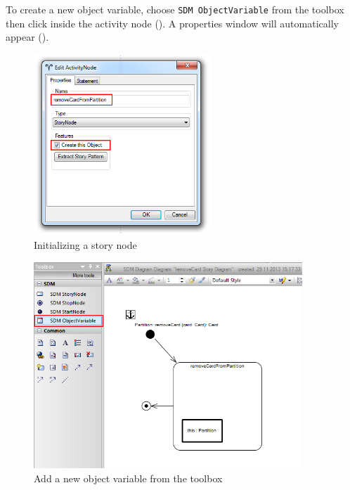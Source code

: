\begin{stepbystep}
\item To create a new object variable, choose \texttt{SDM ObjectVariable} from the toolbox then click inside the activity node
(). A properties window will automatically appear ().

\begin{figure}[htpb]
\begin{center} 
  \includegraphics[width=0.6\textwidth]{../../org.moflon.doc.handbook.03_storyDiagrams/03_removeCard/visRemImages/ea_sdmEditActivityNode}
  \caption{Initializing a story node}  
  \label{ea:story_pattern}
\end{center}
\end{figure}

\begin{figure}[htp]
\begin{center}
  \includegraphics[width=0.9\textwidth]{../../org.moflon.doc.handbook.03_storyDiagrams/03_removeCard/visRemImages/ea_sdmNewObjVar}
  \caption{Add a new object variable from the toolbox}  
  \label{ea:tool_box}
\end{center}
\end{figure}


\end{stepbystep}
